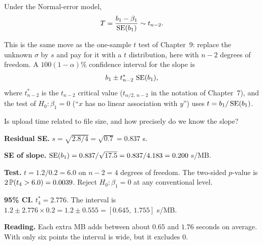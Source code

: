 \begin{theorem}
Under the Normal-error model,
\[
  T = \frac{b_1 - \beta_1}{\SE(b_1)} \sim t_{n-2} .
\]
\end{theorem}

This is the same move as the one-sample $t$ test of Chapter~9: replace the
unknown $\sigma$ by $s$ and pay for it with a $t$ distribution, here with $n-2$
degrees of freedom. A $100(1-\alpha)\%$ confidence interval for the slope is
\[
  b_1 \pm t^*_{n-2}\,\SE(b_1),
\]
where $t^*_{n-2}$ is the $t_{n-2}$ critical value ($t_{\alpha/2,\,n-2}$ in the notation of Chapter~7),
and the test of $H_0\colon \beta_1 = 0$ (``$x$ has no linear association with
$y$'') uses $t = b_1/\SE(b_1)$.

\begin{walkbox}
Is upload time related to file size, and how precisely do we know the
slope?

\textbf{Residual SE.} $s = \sqrt{2.8/4} = \sqrt{0.7} = 0.837$ s.

\textbf{SE of slope.} $\SE(b_1) = 0.837/\sqrt{17.5} = 0.837/4.183 = 0.200$ s/MB.

\textbf{Test.} $t = 1.2/0.2 = 6.0$ on $n-2 = 4$ degrees of freedom. The
two-sided $p$-value is $2\P(t_4 > 6.0) = 0.0039$. Reject $H_0\colon\beta_1=0$
at any conventional level.

\textbf{95\% CI.} $t^*_4 = 2.776$. The interval is
$1.2 \pm 2.776\times 0.2 = 1.2\pm 0.555 = [0.645,\ 1.755]$ s/MB.

\textbf{Reading.} Each extra MB adds between about $0.65$ and $1.76$ seconds on
average. With only six points the interval is wide, but it excludes $0$.
\end{walkbox}

